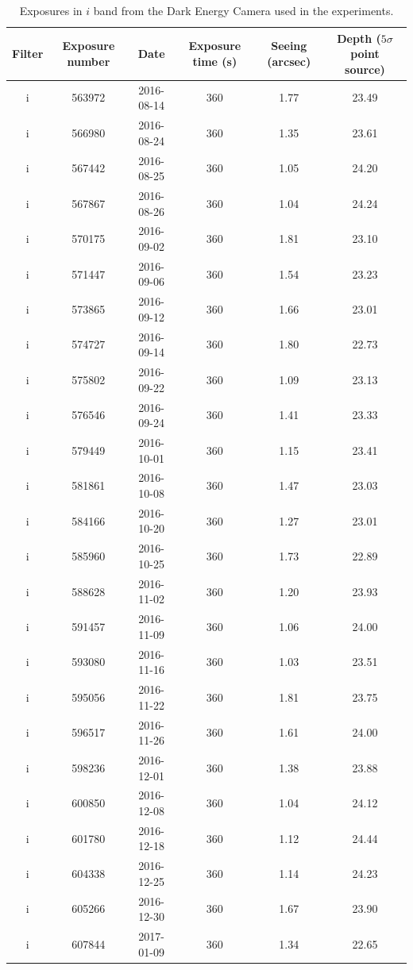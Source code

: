 \documentclass[letterpaper,preprint]{aastex62}
\begin{document}
\begin{table}
  \begin{center}
    \begin{scriptsize}
    \begin{tabular}{cccccc}
      \hline
      Filter & Exposure number & Date & Exposure time (s) &
      Seeing (arcsec) & Depth ($5 \sigma$ point source) \\
      \hline
      i & 563972 & 2016-08-14 & 360 & 1.77 & 23.49 \\
      i & 566980 & 2016-08-24 & 360 & 1.35 & 23.61 \\
      i & 567442 & 2016-08-25 & 360 & 1.05 & 24.20 \\
      i & 567867 & 2016-08-26 & 360 & 1.04 & 24.24 \\
      i & 570175 & 2016-09-02 & 360 & 1.81 & 23.10 \\
      i & 571447 & 2016-09-06 & 360 & 1.54 & 23.23 \\
      i & 573865 & 2016-09-12 & 360 & 1.66 & 23.01 \\
      i & 574727 & 2016-09-14 & 360 & 1.80 & 22.73 \\
      i & 575802 & 2016-09-22 & 360 & 1.09 & 23.13 \\
      i & 576546 & 2016-09-24 & 360 & 1.41 & 23.33 \\
      i & 579449 & 2016-10-01 & 360 & 1.15 & 23.41 \\
      i & 581861 & 2016-10-08 & 360 & 1.47 & 23.03 \\
      i & 584166 & 2016-10-20 & 360 & 1.27 & 23.01 \\
      i & 585960 & 2016-10-25 & 360 & 1.73 & 22.89 \\
      i & 588628 & 2016-11-02 & 360 & 1.20 & 23.93 \\
      i & 591457 & 2016-11-09 & 360 & 1.06 & 24.00 \\
      i & 593080 & 2016-11-16 & 360 & 1.03 & 23.51 \\
      i & 595056 & 2016-11-22 & 360 & 1.81 & 23.75 \\
      i & 596517 & 2016-11-26 & 360 & 1.61 & 24.00 \\
      i & 598236 & 2016-12-01 & 360 & 1.38 & 23.88 \\
      i & 600850 & 2016-12-08 & 360 & 1.04 & 24.12 \\
      i & 601780 & 2016-12-18 & 360 & 1.12 & 24.44 \\
      i & 604338 & 2016-12-25 & 360 & 1.14 & 24.23 \\
      i & 605266 & 2016-12-30 & 360 & 1.67 & 23.90 \\
      i & 607844 & 2017-01-09 & 360 & 1.34 & 22.65 \\
      \hline
    \end{tabular}
    \caption{Exposures in $i$ band from the Dark Energy Camera used in
      the experiments.\label{tab:exposuresi}}
    \end{scriptsize}
  \end{center}
\end{table}
\end{document}
